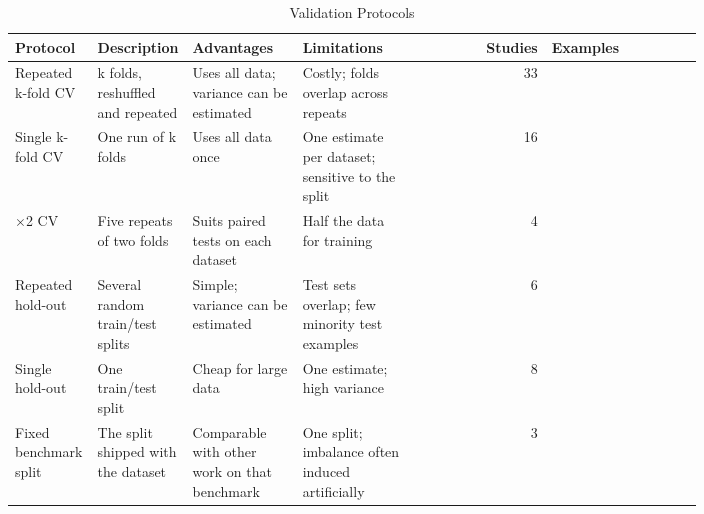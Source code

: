 \begin{table}[t]
  \caption{Validation Protocols}
  \label{tab:empirical-protocols}
  \footnotesize
  \setlength{\tabcolsep}{4pt}
  \begin{tabular}{@{}>{\raggedright\arraybackslash}p{0.12\linewidth}>{\raggedright\arraybackslash}p{0.13\linewidth}>{\raggedright\arraybackslash}p{0.16\linewidth}>{\raggedright\arraybackslash}p{0.17\linewidth}r>{\raggedright\arraybackslash}p{0.22\linewidth}@{}}
    \toprule
    Protocol & Description & Advantages & Limitations & Studies & Examples\\
    \midrule
    Repeated k-fold CV & k folds, reshuffled and repeated & Uses all data; variance can be estimated & Costly; folds overlap across repeats & 33 & \parencite{napierala2010spider2,krawczyk2020mcrbo,naglik2024gmmsampling}\\
    Single k-fold CV & One run of k folds & Uses all data once & One estimate per dataset; sensitive to the split & 16 & \parencite{chawla2002smote,fernandez2013analysing,maldonado2022fwsmote}\\
    5$\times$2 CV & Five repeats of two folds & Suits paired tests on each dataset & Half the data for training & 4 & \parencite{cieslak2008ls,koziarski2019rbo}\\
    Repeated hold-out & Several random train/test splits & Simple; variance can be estimated & Test sets overlap; few minority test examples & 6 & \parencite{he2008adasyn,chen2021rsmote}\\
    Single hold-out & One train/test split & Cheap for large data & One estimate; high variance & 8 & \parencite{vuttipittayamongkol2020nbu,hu2026loyalty}\\
    Fixed benchmark split & The split shipped with the dataset & Comparable with other work on that benchmark & One split; imbalance often induced artificially & 3 & \parencite{buda2018systematic,mullick2019gamo}\\
    \bottomrule
  \end{tabular}
\end{table}
